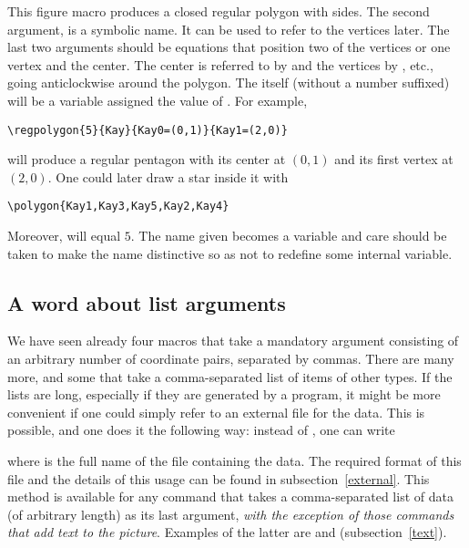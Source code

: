 \documentclass[letterpaper]{article}
\begin{document}
This figure macro produces a closed regular polygon with 
sides. The second argument,  is a symbolic name. It can be
used to refer to the vertices later. The last two arguments should be
equations that position two of the vertices or one vertex and the
center. The center is referred to by  and the vertices
by  , etc., going anticlockwise
around the polygon. The  itself (without a number suffixed)
will be a \MF{} variable assigned the value of . For example,
\begin{verbatim}
\regpolygon{5}{Kay}{Kay0=(0,1)}{Kay1=(2,0)}
\end{verbatim}
will produce a regular pentagon with its center at $(0,1)$ and its first
vertex at $(2,0)$. One could later draw a star inside it with
\begin{verbatim}
\polygon{Kay1,Kay3,Kay5,Kay2,Kay4}
\end{verbatim}
Moreover,  will equal $5$. The name given becomes a \MF{}
variable and care should be taken to make the name distinctive so as not
to redefine some internal variable.

\subsection{A word about list arguments}\label{list}

We have seen already four \mfp{} macros that take a mandatory argument
consisting of an arbitrary number of coordinate pairs, separated by
commas. There are many more, and some that take a comma-separated list
of items of other types. If the lists are long, especially if they are
generated by a program, it might be more convenient if one could simply
refer to an external file for the data. This is possible, and one does
it the following way: instead of , one
can write
\begin{ex}
\end{ex}
where  is the full name of the file containing the data.
The required format of this file and the details of this usage can be
found in subsection~\ref{external}. This method is available for any
command that takes a comma-separated list of data (of arbitrary length)
as its last argument, \emph{with the exception of those commands that
add text to the picture}. Examples of the latter are  and
 (subsection~\ref{text}).
\end{document}
